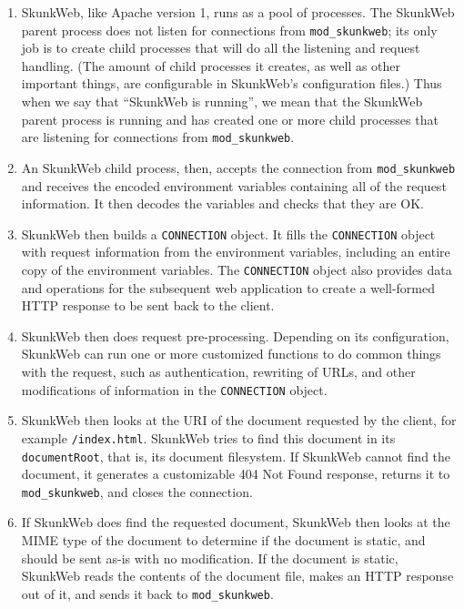 \documentclass[titlepage]{manual}
\begin{document}
\begin{enumerate}
\item SkunkWeb, like Apache version 1, runs as a pool of
processes. The SkunkWeb parent process does not listen for
connections from \texttt{mod\_skunkweb}; its only job is to create
child processes that will do all the listening and request
handling. (The amount of child processes it creates, as well as other
important things, are configurable in SkunkWeb's configuration files.)
Thus when we say that ``SkunkWeb is running'', we mean that the SkunkWeb
parent process is running and has created one or more child processes
that are listening for connections from \texttt{mod\_skunkweb}.

\item An SkunkWeb child process, then, accepts the connection from
\texttt{mod\_skunkweb} and receives the encoded environment variables
containing all of the request information. It then decodes the
variables and checks that they are OK.

\item SkunkWeb then builds a \texttt{CONNECTION} object. It fills the
\texttt{CONNECTION} object with request information from the environment
variables, including an entire copy of the environment variables.  The
\texttt{CONNECTION} object also provides data and operations for the subsequent
web application to create a well-formed HTTP response to be sent back
to the client.

\item SkunkWeb then does request pre-processing. Depending on its
configuration, SkunkWeb can run one or more customized functions to do
common things with the request, such as authentication, rewriting of
URLs, and other modifications of information in the
\texttt{CONNECTION} object.

\item SkunkWeb then looks at the URI of the document requested by the
client, for example \texttt{/index.html}. SkunkWeb tries to find this
document in its \texttt{documentRoot}, that is, its document
filesystem. If SkunkWeb cannot find the document, it generates a
customizable 404 Not Found response, returns it to
\texttt{mod\_skunkweb}, and closes the connection.  

\item If SkunkWeb does find the requested document, SkunkWeb then
looks at the MIME type of the document to determine if the document
is static, and should be sent as-is with no modification. If the
document is static, SkunkWeb reads the contents of the document file,
makes an HTTP response out of it, and sends it back to
\texttt{mod\_skunkweb}.


\end{enumerate}
\end{document}
